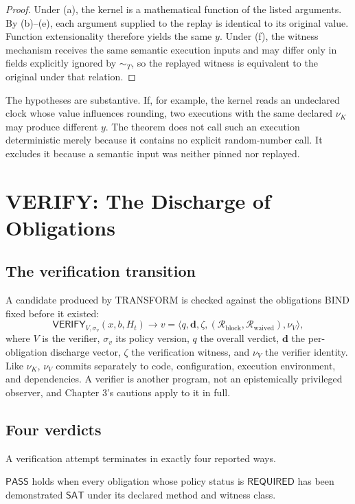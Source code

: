 \documentclass[11pt,openany]{book}
\newcommand{\Verify}{\mathsf{VERIFY}}
\newcommand{\Pass}{\mathsf{PASS}}
\newcommand{\Required}{\mathsf{REQUIRED}}
\begin{document}
\begin{proof}
Under (a), the kernel is a mathematical function of the listed arguments. By
(b)--(e), each argument supplied to the replay is identical to its original
value. Function extensionality therefore yields the same \(y\). Under (f), the
witness mechanism receives the same semantic execution inputs and may differ
only in fields explicitly ignored by \(\sim_T\), so the replayed witness is
equivalent to the original under that relation.
\end{proof}

The hypotheses are substantive. If, for example, the kernel reads an
undeclared clock whose value influences rounding, two executions with the same
declared \(\nu_K\) may produce different \(y\). The theorem does not call such
an execution deterministic merely because it contains no explicit random-number
call. It excludes it because a semantic input was neither pinned nor replayed.

\chapter{VERIFY: The Discharge of Obligations}
\section{The verification transition}

A candidate produced by TRANSFORM is checked against the obligations BIND
fixed before it existed:
\[
 \Verify_{V,\sigma_v}(x,b,H_t)
 \longrightarrow
 v=\langle q,\mathbf d,\zeta,
          (\mathcal R_{\mathrm{block}},\mathcal R_{\mathrm{waived}}),
          \nu_V\rangle,
\]
where \(V\) is the verifier, \(\sigma_v\) its policy version, \(q\) the
overall verdict, \(\mathbf d\) the per-obligation discharge vector,
\(\zeta\) the verification witness, and \(\nu_V\) the verifier identity.
Like \(\nu_K\), \(\nu_V\) commits separately to code, configuration,
execution environment, and dependencies. A verifier is another program, not an
epistemically privileged observer, and Chapter 3's cautions apply to it in
full.

\section{Four verdicts}

A verification attempt terminates in exactly four reported ways.

\(\Pass\) holds when every obligation whose policy status is \(\Required\)
has been demonstrated \(\mathsf{SAT}\) under its declared method and witness
class.
\end{document}

